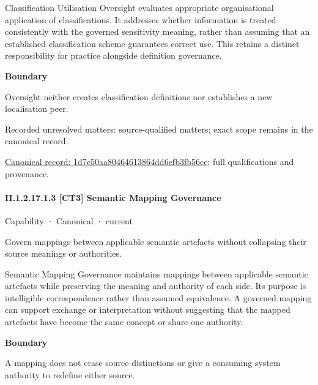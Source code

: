 Classification Utilisation Oversight evaluates appropriate organisational application of classifications. It addresses whether information is treated consistently with the governed sensitivity meaning, rather than assuming that an established classification scheme guarantees correct use. This retains a distinct responsibility for practice alongside definition governance.



\textbf{Boundary}



Oversight neither creates classification definitions nor establishes a new localisation peer.


{\small Recorded unresolved matters: source-qualified matters; exact scope remains in the canonical record.}\par
{\footnotesize \href{../../../../../../../continuum/strategy/capability/1d7c50aa80464613864dd6efb3fb56cc.md}{Canonical record: 1d7c50aa80464613864dd6efb3fb56cc}; full qualifications and provenance.}\par
\paragraph*{II.1.2.17.1.3 [CT3] Semantic Mapping Governance}
\label{navigation:II.1.2.17.1.3}

\label{element:17dc6ab9f4394049a5327415d19628f2}
{\small Capability · Canonical · current}\par

Govern mappings between applicable semantic artefacts without collapsing their source meanings or authorities.



Semantic Mapping Governance maintains mappings between applicable semantic artefacts while preserving the meaning and authority of each side. Its purpose is intelligible correspondence rather than assumed equivalence. A governed mapping can support exchange or interpretation without suggesting that the mapped artefacts have become the same concept or share one authority.



\textbf{Boundary}



A mapping does not erase source distinctions or give a consuming system authority to redefine either source.


